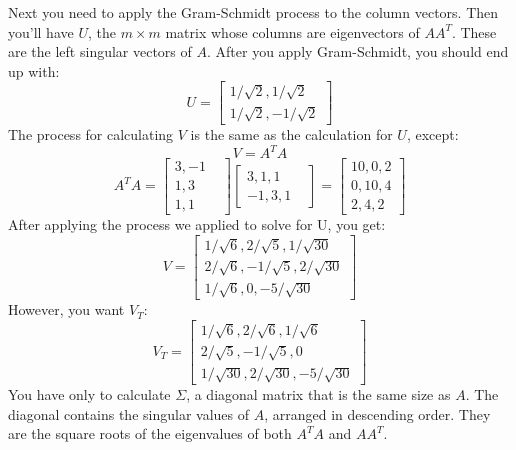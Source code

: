 Next you need to apply the Gram-Schmidt process to the column vectors. Then you'll have $U$, the $m \times m$ matrix whose columns are eigenvectors of $AA^T$. These are the left singular vectors of $A$. After you apply Gram-Schmidt, you should end up with:
$$
U = \begin{bmatrix}
1/\sqrt{2},1/\sqrt{2} \\
1/\sqrt{2},-1/\sqrt{2} 
\end{bmatrix}
$$
The process for calculating $V$ is the same as the calculation for $U$, except:
$$V = A^TA$$ 
$$A^TA = 
\begin{bmatrix}
3,-1 &  \\
1,3 &  \\
1,1& 
\end{bmatrix}
\begin{bmatrix}
3,1,1 &  \\
 -1, 3,1& 
\end{bmatrix}
=
\begin{bmatrix}
10,0,2 \\
0,10,4 \\
 2,4,2
\end{bmatrix}
$$
After applying the process we applied to solve for U, you get:
$$
V = \begin{bmatrix}
1/\sqrt{6},2/\sqrt{5},1/\sqrt{30} \\
2/\sqrt{6},-1/\sqrt{5},2/\sqrt{30}\\
1/\sqrt{6},0,-5/\sqrt{30}
\end{bmatrix}
$$
However, you want $V_T$:
$$
V_T =
\begin{bmatrix}
1/\sqrt{6},2/\sqrt{6},1/\sqrt{6} \\
2/\sqrt{5},-1/\sqrt{5},0\\
1/\sqrt{30},2/\sqrt{30},-5/\sqrt{30}
\end{bmatrix}
$$
You have only to calculate $\Sigma$, a diagonal matrix that is the same size as $A$. The diagonal contains the singular values of $A$, arranged in descending order. They are the square roots of the eigenvalues of both $A^TA$ and  $AA^T$.

